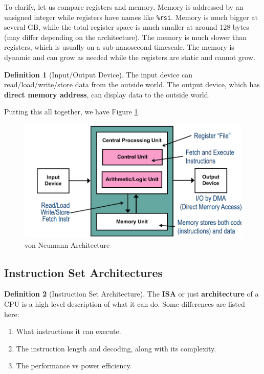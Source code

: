 \documentclass{article}
\theoremstyle{definition}
\newtheorem{definition}{Definition}[section]
\begin{document}
    To clarify, let us compare registers and memory. Memory is addressed by an unsigned integer while registers have names like \texttt{\%rsi}. Memory is much bigger at several GB, while the total register space is much smaller at around 128 bytes (may differ depending on the architecture). The memory is much slower than registers, which is usually on a sub-nanosecond timescale. The memory is dynamic and can grow as needed while the registers are static and cannot grow.


    \begin{definition}[Input/Output Device]
      The input device can read/load/write/store data from the outside world. The output device, which has \textbf{direct memory address}, can display data to the outside world. 
    \end{definition}

    Putting this all together, we have Figure \ref{fig:von_neumann_arch}. 

    \begin{figure}[hbt!]
      \centering 
      \includegraphics[scale=0.4]{img/von_neumann_arch.png}
      \caption{von Neumann Architecture} 
      \label{fig:von_neumann_arch}
    \end{figure}

  \subsection{Instruction Set Architectures} 

    \begin{definition}[Instruction Set Architecture]
      The \textbf{ISA} or just \textbf{architecture} of a CPU is a high level description of what it can do. Some differences are listed here: 
      \begin{enumerate} 
        \item What instructions it can execute. 
        \item The instruction length and decoding, along with its complexity. 
        \item The performance vs power efficiency. 
      \end{enumerate}
    \end{definition}
\end{document}
